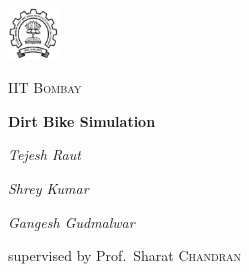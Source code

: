 \documentclass[17pt, a4paper]{extarticle}
\begin{document}
\begin{titlepage}
	\centering
	\includegraphics[width=0.1\textwidth]{logo}\par\vspace{1.0cm}
	{\scshape\LARGE IIT Bombay \par}
	\vspace{1.0cm}
	\color{green}
	{\LARGE\bfseries Dirt Bike Simulation\par}
	\color{black}
	\vspace{1.0cm}
	{\itshape Tejesh Raut\par}
	{\itshape Shrey Kumar\par}
	{\itshape Gangesh Gudmalwar\par}
	\vfill
	supervised by
	Prof.~Sharat \textsc{Chandran}

	\vfill
\end{titlepage}
\end{document}

